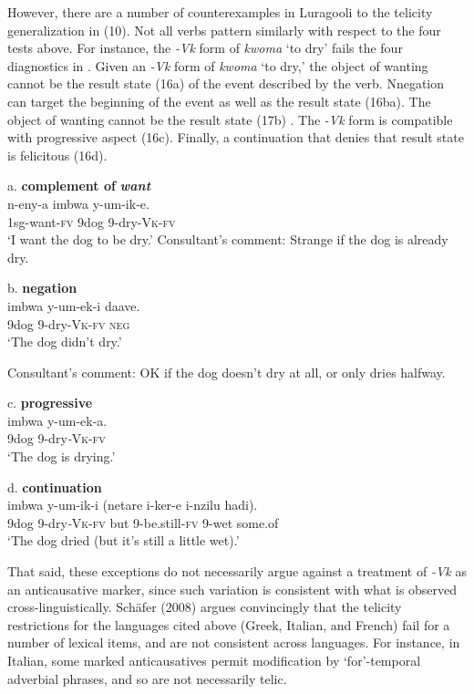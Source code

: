 \documentclass[output=paper]{langsci/langscibook}
\begin{document}
However, there are a number of counterexamples in Luragooli to the telicity generalization in (10). Not all verbs pattern similarly with respect to the four tests above. For instance, the \textit{{}-Vk} form of \textit{kwoma} ‘to dry’ fails the four diagnostics in . Given an \textit{{}-Vk} form of \textit{kwoma }‘to dry,’ the object of wanting cannot be the result state (16a) of the event described by the verb. Nnegation can target the beginning of the event as well as the result state (16ba). The object of wanting cannot be the result state (17b) . The \textit{{}-Vk} form is compatible with progressive aspect (16c). Finally, a continuation that denies that result state is felicitous (16d).

\ea
{a. \textbf{complement of }\textbf{\textit{want}}}\\
\gll n-eny-a          imbwa y-um-ik-e.\\
     1sg-want-\textsc{fv} 9dog    9-dry-\textsc{Vk}{}-\textsc{fv}\\
\glt ‘I want the dog to be dry.’
\z
\glt Consultant’s comment: Strange if the dog is already dry.
\z

\ea
{b. \textbf{negation}}\\
\gll imbwa y-um-ek-i     daave.\\
     9dog    9-dry-\textsc{Vk}{}-\textsc{fv} \textsc{neg}\\
\glt ‘The dog didn’t dry.’

\glt Consultant’s comment: OK if the dog doesn’t dry at all, or only dries halfway.
\z

\ea
{c. \textbf{progressive}}\\
\gll imbwa y-um-ek-a.\\
     9dog   9-dry\textit{{}-}\textsc{Vk}{}-\textsc{fv}\\
\glt ‘The dog is drying.’
\z

\ea
{d. \textbf{continuation}}\\
\gll imbwa y-um-ik-i      (netare i-ker-e         i-nzilu hadi).\\
     9dog   9-dry\textit{{}-}\textsc{Vk}{}-\textsc{fv} but       9-be.still-\textsc{fv} 9-wet some.of\\
\glt ‘The dog dried (but it’s still a little wet).’
\z

That said, these exceptions do not necessarily argue against a treatment of \textit{{}-Vk} as an anticausative marker, since such variation is consistent with what is observed cross-linguistically. Schäfer (2008) argues convincingly that the telicity restrictions for the languages cited above (Greek, Italian, and French) fail for a number of lexical items, and are not consistent across languages. For instance, in Italian, some marked anticausatives permit modification by ‘for’-temporal adverbial phrases, and so are not necessarily telic.
\end{document}
